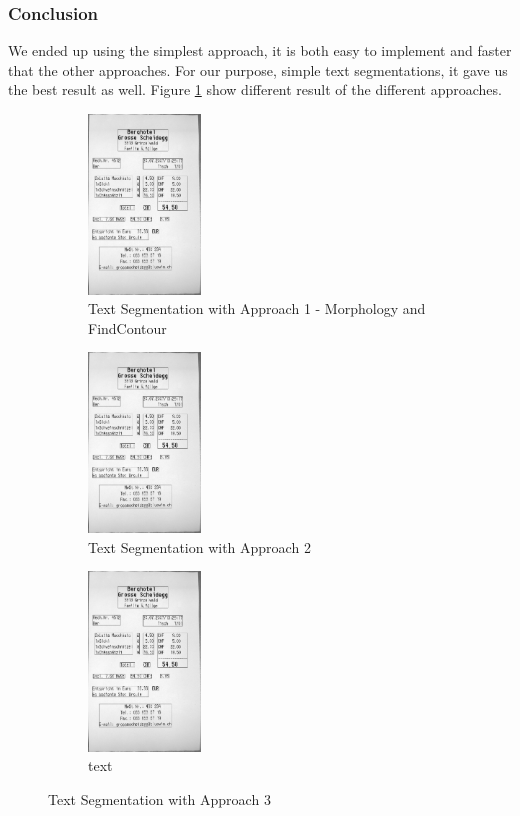 \documentclass[11pt,a4paper,UKenglish]{article}
\begin{document}
\subsubsection{Conclusion}
We ended up using the simplest approach, it is both easy to implement and faster that the other approaches. For our purpose, simple text segmentations, it gave us the best result as well. Figure \ref{fig:Text_detection_approaches} show different result of the different approaches.

\begin{figure}
  \centering
  \begin{subfigure}[t]{4cm}
    \includegraphics[width=3cm]{res/segment_text1.png}
    \caption{Text Segmentation with Approach 1 - Morphology and FindContour}
  \end{subfigure}
  \hspace{5mm}%
  \begin{subfigure}[t]{4cm}
    \includegraphics[width=3cm]{res/segment_text1.png}
    \caption{Text Segmentation with Approach 2}
  \end{subfigure}
  \hspace{5mm}%
  \begin{subfigure}[t]{4cm}
    \includegraphics[width=3cm]{res/segment_text1.png}
    \caption{text}
  \end{subfigure}
  \caption{Text Segmentation with Approach 3}
  \label{fig:Text_detection_approaches}
\end{figure}
\end{document}
